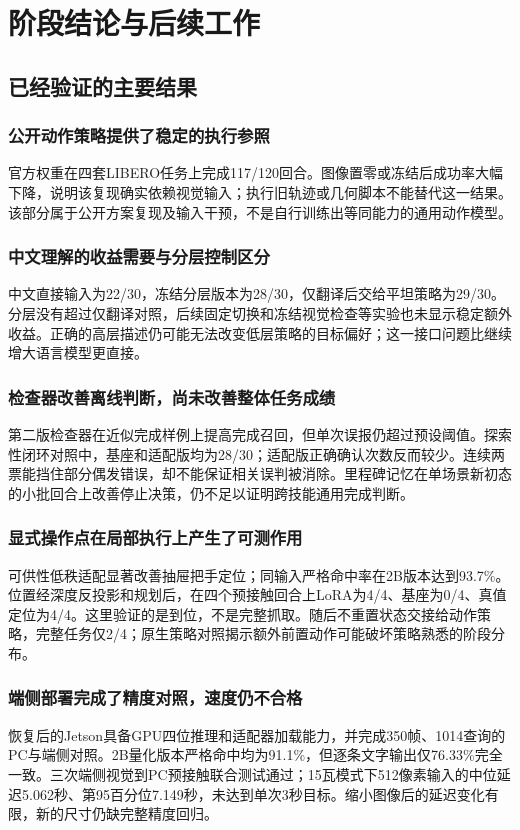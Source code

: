 \chapter{阶段结论与后续工作}
\section{已经验证的主要结果}
\subsection{公开动作策略提供了稳定的执行参照}
官方\pifive{}权重在四套LIBERO任务上完成117/120回合。图像置零或冻结后成功率大幅下降，说明该复现确实依赖视觉输入；执行旧轨迹或几何脚本不能替代这一结果。该部分属于公开方案复现及输入干预，不是自行训练出等同能力的通用动作模型。
\subsection{中文理解的收益需要与分层控制区分}
中文直接输入为22/30，冻结分层版本为28/30，仅翻译后交给平坦策略为29/30。分层没有超过仅翻译对照，后续固定切换和冻结视觉检查等实验也未显示稳定额外收益。正确的高层描述仍可能无法改变低层策略的目标偏好；这一接口问题比继续增大语言模型更直接。
\subsection{检查器改善离线判断，尚未改善整体任务成绩}
第二版检查器在近似完成样例上提高完成召回，但单次误报仍超过预设阈值。探索性闭环对照中，基座和适配版均为28/30；适配版正确确认次数反而较少。连续两票能挡住部分偶发错误，却不能保证相关误判被消除。里程碑记忆在单场景新初态的小批回合上改善停止决策，仍不足以证明跨技能通用完成判断。
\subsection{显式操作点在局部执行上产生了可测作用}
可供性低秩适配显著改善抽屉把手定位；同输入严格命中率在2B版本达到93.7\%。位置经深度反投影和规划后，在四个预接触回合上LoRA为4/4、基座为0/4、真值定位为4/4。这里验证的是到位，不是完整抓取。随后不重置状态交接给动作策略，完整任务仅2/4；原生策略对照揭示额外前置动作可能破坏策略熟悉的阶段分布。
\subsection{端侧部署完成了精度对照，速度仍不合格}
恢复后的Jetson具备GPU四位推理和适配器加载能力，并完成350帧、1014查询的PC与端侧对照。2B量化版本严格命中均为91.1\%，但逐条文字输出仅76.33\%完全一致。三次端侧视觉到PC预接触联合测试通过；15瓦模式下512像素输入的中位延迟5.062秒、第95百分位7.149秒，未达到单次3秒目标。缩小图像后的延迟变化有限，新的尺寸仍缺完整精度回归。
